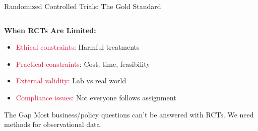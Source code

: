 \documentclass[aspectratio=169,11pt]{beamer}
\begin{document}
\begin{frame}{Randomized Controlled Trials: The Gold Standard}
\begin{columns}
\begin{column}{0.5\textwidth}
\begin{figure}
\end{figure}

\textbf{When RCTs Are Limited:}
\begin{itemize}
\item \textcolor{crimson}{Ethical constraints}: Harmful treatments
\item \textcolor{crimson}{Practical constraints}: Cost, time, feasibility
\item \textcolor{crimson}{External validity}: Lab vs real world
\item \textcolor{crimson}{Compliance issues}: Not everyone follows assignment
\end{itemize}

\begin{alertblock}{The Gap}
Most business/policy questions can't be answered with RCTs. We need methods for observational data.
\end{alertblock}
\end{column}
\end{columns}
\end{frame}
\end{document}
